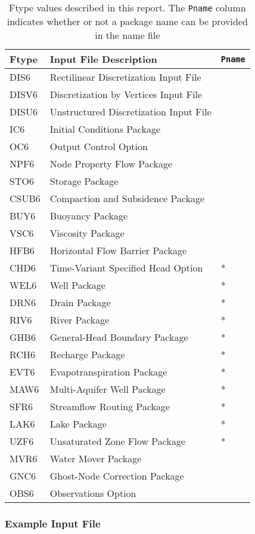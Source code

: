 \begin{table}[H]
\caption{Ftype values described in this report.  The \texttt{Pname} column indicates whether or not a package name can be provided in the name file}
\small
\begin{center}
\begin{tabular*}{\columnwidth}{l l l}
\hline
\hline
Ftype & Input File Description & \texttt{Pname}\\
\hline
DIS6 & Rectilinear Discretization Input File \\
DISV6 & Discretization by Vertices Input File \\
DISU6 & Unstructured Discretization Input File \\
IC6 & Initial Conditions Package \\
OC6 & Output Control Option \\
NPF6 & Node Property Flow Package \\ 
STO6 & Storage Package \\
CSUB6 & Compaction and Subsidence Package \\
BUY6 & Buoyancy Package \\
VSC6 & Viscosity Package \\
HFB6 & Horizontal Flow Barrier Package\\
CHD6 & Time-Variant Specified Head Option & * \\
WEL6 & Well Package & * \\
DRN6 & Drain Package & * \\
RIV6 & River Package & * \\
GHB6 & General-Head Boundary Package & * \\
RCH6 & Recharge Package & * \\
EVT6 & Evapotranspiration Package & * \\
MAW6 & Multi-Aquifer Well Package & * \\
SFR6 & Streamflow Routing Package & * \\
LAK6 & Lake Package & * \\
UZF6 & Unsaturated Zone Flow Package & * \\
MVR6 & Water Mover Package \\
GNC6 & Ghost-Node Correction Package \\
OBS6 & Observations Option \\
\hline 
\end{tabular*}
\label{table:ftype}
\end{center}
\normalsize
\end{table}

\vspace{5mm}
\subsubsection{Example Input File}


